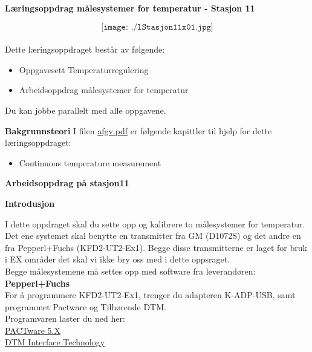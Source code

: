 

\vskip 5pt

\vskip 5pt
\begin{center}
	\huge
	\textbf{Læringsoppdrag målesystemer for temperatur - Stasjon 11}
	\normalsize
\vskip 5pt 
\end{center}

$$\texttt{[image: ./lStasjon11x01.jpg]}$$\\

\vskip 1cm
Dette læringsoppdraget består av følgende:

\begin{itemize}[noitemsep]
	\item Oppgavesett Temperaturregulering
	\item Arbeidsoppdrag målesystemer for temperatur
\end{itemize}


 
\vskip 5pt 

Du kan jobbe parallelt med alle oppgavene. 

\vskip 5pt 
\textbf{Bakgrunnsteori}
 I filen \href {https://autofaget.no/pdfs/afgv.pdf}{afgv.pdf} er følgende kapittler til hjelp for dette læringsoppdraget:
 \begin{itemize}[noitemsep]
	 \item Continuous temperature measurement
 \end{itemize}
\newpage
\textbf{Arbeidsoppdrag på stasjon11}

\vskip 1cm
\vskip 1cm
\textbf{Introdusjon}

\vskip 5pt 
I dette oppdraget skal du sette opp og kalibrere to målesystemer for temperatur. Det ene systemet skal benytte en transmitter fra GM (D1072S) og det andre en fra Pepperl+Fuchs (KFD2-UT2-Ex1). Begge disse transmitterne er laget for bruk i EX områder det skal vi ikke bry oss med i dette oppsraget. 
\\
Begge målesystemene må settes opp med software fra leverandøren:
\\
\textbf{Pepperl+Fuchs}
\\
For å programmere KFD2-UT2-Ex1, trenger du adapteren K-ADP-USB, samt programmet Pactware og Tilhørende DTM.
\\

Programvaren laster du ned her: 
\\
\href {https://www.pepperl-fuchs.com/norway/no/classid_163.htm?view=productdetails&prodid=83574#software}{PACTware 5.X}
\\
\href {https://www.pepperl-fuchs.com/norway/no/classid_1804.htm?view=productdetails&prodid=32802}{DTM Interface Technology}
\\
 

